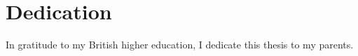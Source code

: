 \chapter*{Dedication}

In gratitude to my British higher education, I dedicate this thesis to my parents.